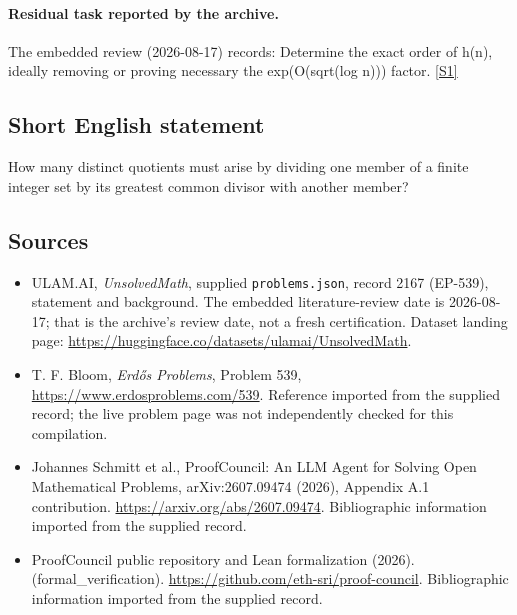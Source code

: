 \documentclass[11pt,a4paper]{article}
\newcommand{\sref}[2]{\hyperlink{source:#1:#2}{[S#2]}}
\begin{document}
\paragraph{Residual task reported by the archive.}

The embedded review (2026-08-17) records: Determine the exact order of h(n), ideally removing or proving necessary the exp(O(sqrt(log n))) factor. \sref{2167}{1}

\subsection{Short English statement}

How many distinct quotients must arise by dividing one member of a finite integer set by its greatest common divisor with another member?

\subsection{Sources}

{\small

\begin{itemize}

\item[\hypertarget{source:2167:1}{S1}] ULAM.AI, \emph{UnsolvedMath}, supplied \texttt{problems.json}, record 2167 (EP-539), statement and background. The embedded literature-review date is 2026-08-17; that is the archive’s review date, not a fresh certification. Dataset landing page: \url{https://huggingface.co/datasets/ulamai/UnsolvedMath}.

\item[\hypertarget{source:2167:2}{S2}] T. F. Bloom, \emph{Erdős Problems}, Problem 539, \url{https://www.erdosproblems.com/539}. Reference imported from the supplied record; the live problem page was not independently checked for this compilation.

\item[\hypertarget{source:2167:3}{S3}] Johannes Schmitt et al., ProofCouncil: An LLM Agent for Solving Open Mathematical Problems, arXiv:2607.09474 (2026), Appendix A.1 contribution. \url{https://arxiv.org/abs/2607.09474}. Bibliographic information imported from the supplied record.

\item[\hypertarget{source:2167:4}{S4}] ProofCouncil public repository and Lean formalization (2026). (formal\_verification). \url{https://github.com/eth-sri/proof-council}. Bibliographic information imported from the supplied record.

\end{itemize}

}

\label{end:2167}
\end{document}
